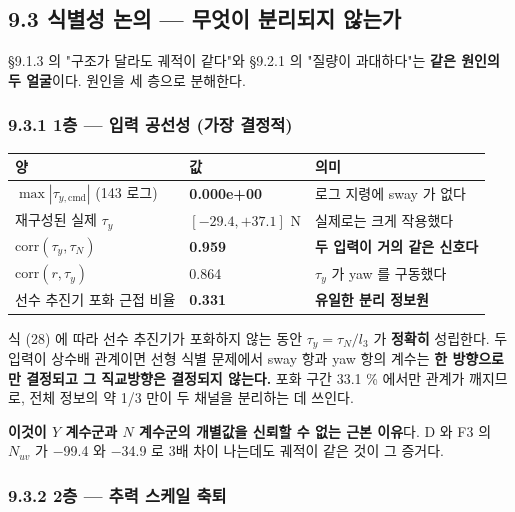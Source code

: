 \documentclass[10pt,a4paper]{article}
\begin{document}
\subsection*{9.3 식별성 논의 --- 무엇이 분리되지 않는가}

\S{}9.1.3 의 "구조가 달라도 궤적이 같다"와 \S{}9.2.1 의 "질량이 과대하다"는 \textbf{같은 원인의 두 얼굴}이다. 원인을 세 층으로 분해한다.

\subsubsection*{9.3.1 1층 --- 입력 공선성 (가장 결정적)}

\begin{center}\footnotesize\setlength{\tabcolsep}{3pt}
\begin{tabular}{@{}lll@{}}
\toprule
\textbf{양} & \textbf{값} & \textbf{의미} \\
\midrule
$\max|\tau_{y,\text{cmd}}|$ (143 로그) & \textbf{0.000e+00} & 로그 지령에 sway 가 없다 \\
재구성된 실제 $\tau_y$ & $[-29.4, +37.1]$ N & 실제로는 크게 작용했다 \\
$\mathrm{corr}(\tau_y, \tau_N)$ & \textbf{0.959} & \textbf{두 입력이 거의 같은 신호다} \\
$\mathrm{corr}(r, \tau_y)$ & 0.864 & $\tau_y$ 가 yaw 를 구동했다 \\
선수 추진기 포화 근접 비율 & \textbf{0.331} & \textbf{유일한 분리 정보원} \\
\bottomrule
\end{tabular}
\end{center}

식 (28) 에 따라 선수 추진기가 포화하지 않는 동안 $\tau_y = \tau_N/l_3$ 가 \textbf{정확히} 성립한다. 두 입력이 상수배 관계이면 선형 식별 문제에서 sway 항과 yaw 항의 계수는 \textbf{한 방향으로만 결정되고 그 직교방향은 결정되지 않는다.} 포화 구간 33.1 \% 에서만 관계가 깨지므로, 전체 정보의 약 1/3 만이 두 채널을 분리하는 데 쓰인다.

\textbf{이것이 $Y$ 계수군과 $N$ 계수군의 개별값을 신뢰할 수 없는 근본 이유}다. D 와 F3 의 $N_{uv}$ 가 $-$99.4 와 $-$34.9 로 3배 차이 나는데도 궤적이 같은 것이 그 증거다.

\subsubsection*{9.3.2 2층 --- 추력 스케일 축퇴}
\end{document}
